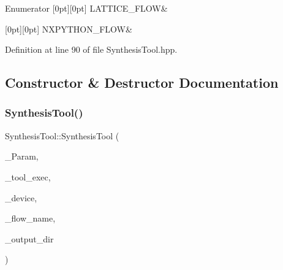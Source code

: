 \begin{DoxyEnumFields}{Enumerator}
[0pt][0pt]{}\mbox{\label{classSynthesisTool_a8a3b714a93c1e17e715253b5ea2e2647a4b33ad7ddbf78d8ddfb929329c0d84c7}} 
L\+A\+T\+T\+I\+C\+E\+\_\+\+F\+L\+OW&\\
\hline

[0pt][0pt]{}\mbox{\label{classSynthesisTool_a8a3b714a93c1e17e715253b5ea2e2647a9eb44613096ccf79c403259a10ccf8ca}} 
N\+X\+P\+Y\+T\+H\+O\+N\+\_\+\+F\+L\+OW&\\
\hline

\end{DoxyEnumFields}


Definition at line 90 of file Synthesis\+Tool.\+hpp.



\subsection{Constructor \& Destructor Documentation}
\mbox{\label{classSynthesisTool_a2a61e2a0d17d1365585660434ac66107}} 
\subsubsection{\texorpdfstring{Synthesis\+Tool()}{SynthesisTool()}}
{\footnotesize\ttfamily Synthesis\+Tool\+::\+Synthesis\+Tool (\begin{DoxyParamCaption}\item[{const \hyperlink{Parameter_8hpp_a37841774a6fcb479b597fdf8955eb4ea}{Parameter\+Const\+Ref} \&}]{\+\_\+\+Param,  }\item[{std\+::string}]{\+\_\+tool\+\_\+exec,  }\item[{const \hyperlink{target__device_8hpp_acedb2b7a617e27e6354a8049fee44eda}{target\+\_\+device\+Ref} \&}]{\+\_\+device,  }\item[{const std\+::string \&}]{\+\_\+flow\+\_\+name,  }\item[{std\+::string}]{\+\_\+output\+\_\+dir }\end{DoxyParamCaption})}



